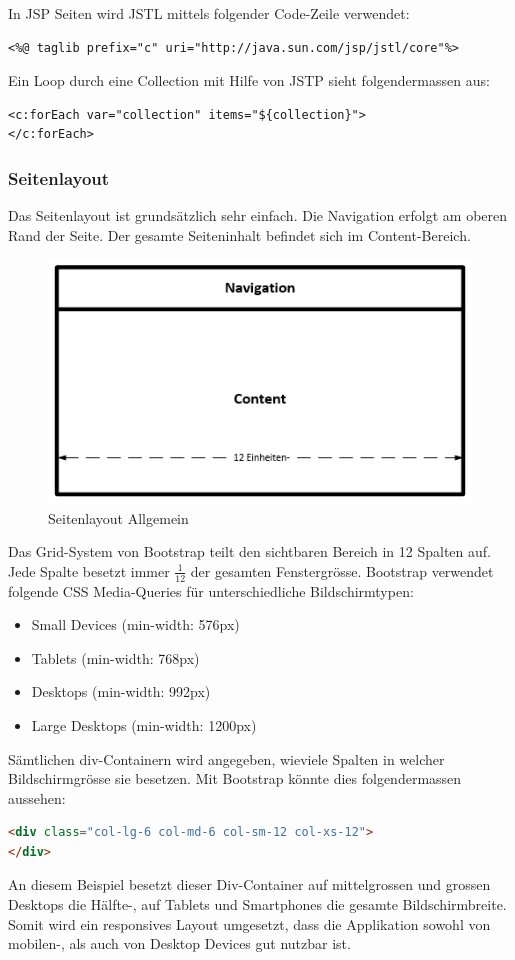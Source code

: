 In JSP Seiten wird JSTL mittels folgender Code-Zeile verwendet:
\begin{lstlisting}
<%@ taglib prefix="c" uri="http://java.sun.com/jsp/jstl/core"%>
\end{lstlisting}

Ein Loop durch eine Collection mit Hilfe von JSTP sieht folgendermassen aus:
\begin{lstlisting}
<c:forEach var="collection" items="${collection}">
</c:forEach>
\end{lstlisting}

\subsubsection{Seitenlayout}
Das Seitenlayout ist grundsätzlich sehr einfach. Die Navigation erfolgt am oberen Rand der Seite. Der gesamte Seiteninhalt befindet sich im Content-Bereich. 
\begin{figure}[H]
\centering
\includegraphics[scale=0.9]{../04_Realisierung/images/userinterface/seitenlayout_allgemein_large.png}
\caption{Seitenlayout Allgemein}
\end{figure}
Das Grid-System von Bootstrap teilt den sichtbaren Bereich in 12 Spalten auf. Jede Spalte besetzt immer $\frac{1}{12}$ der gesamten Fenstergrösse. Bootstrap verwendet folgende CSS Media-Queries für unterschiedliche Bildschirmtypen:
\begin{itemize}
\item Small Devices (min-width: 576px)
\item Tablets (min-width: 768px)
\item Desktops (min-width: 992px)
\item Large Desktops (min-width: 1200px)
\end{itemize}
Sämtlichen div-Containern wird angegeben, wieviele Spalten in welcher Bildschirmgrösse sie besetzen. Mit Bootstrap könnte dies folgendermassen aussehen: 
\begin{lstlisting}[language=html]
<div class="col-lg-6 col-md-6 col-sm-12 col-xs-12">
</div>
\end{lstlisting}
An diesem Beispiel besetzt dieser Div-Container auf mittelgrossen und grossen Desktops die Hälfte-, auf Tablets und Smartphones die gesamte Bildschirmbreite. Somit wird ein responsives Layout umgesetzt, dass die Applikation sowohl von mobilen-, als auch von Desktop Devices gut nutzbar ist.

